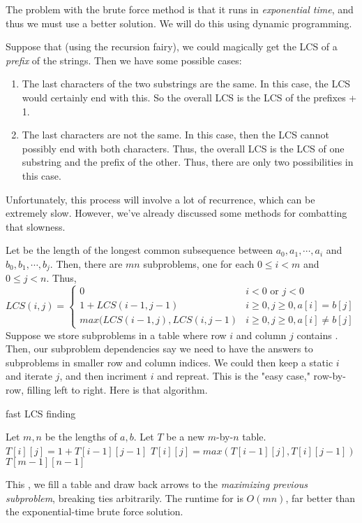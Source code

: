 \documentclass[titlepage, 12pt, leqno]{article}
\begin{document}
The problem with the brute force method is that it runs in \textit{exponential
time}, and thus we must use a better solution. We will do this using dynamic
programming. 

Suppose that (using the recursion fairy), we could magically get
the LCS of a \textit{prefix} of the strings. Then we have some possible cases:
\begin{enumerate}
    \item The last characters of the two substrings are the same. In this case,
        the LCS would certainly end with this. So the overall LCS is the LCS
        of the prefixes + 1.
    \item The last characters are not the same. In this case, then the LCS 
        cannot possibly end with both characters. Thus, the overall LCS is
        the LCS of one substring and the prefix of the other. Thus, there
        are only two possibilities in this case.
\end{enumerate}
Unfortunately, this process will involve a lot of recurrence, which can be
extremely slow. However, we've already discussed some methods for combatting
that slowness.

Let  be the length of the longest common subsequence between
$a_{0}, a_{1}, \cdots , a_{i}$ and $b_{0}, b_{1}, \cdots ,b_{j}$. Then, there
are $mn$ subproblems, one for each $0\le i < m$ and $0 \le j < n$. Thus,
\[
LCS(i,j) =
\begin{cases}
    0 & i < 0 \text{ or } j < 0 \\
    1 + LCS(i-1,j-1) & i \ge 0, j \ge 0, a[i] = b[j] \\
    max(LCS(i-1,j), LCS(i,j-1) & i \ge 0, j \ge 0, a[i] \ne b[j]
\end{cases}
\]
Suppose we store subproblems in a table where row $i$ and column $j$ contains
. Then, our subproblem dependencies say we need to have the 
answers to subproblems in smaller row and column indices. We could then keep a
static $i$ and iterate $j$, and then incriment $i$ and repreat. This is the "easy 
case," row-by-row, filling left to right. Here is that algorithm.

\begin{algorithm}
\caption{fast LCS finding}
\begin{algorithmic}[1]
    \State Let $m,n$ be the lengths of $a,b$.
    \State Let $T$ be a new $m$-by-$n$ table.
                \State $T[i][j] = 1 + T[i-1][j-1]$
            \Else
                \State $T[i][j] = max(T[i-1][j], T[i][j-1])$
            \EndIf
        \EndFor
    \EndFor
    \State \Return $T[m-1][n-1]$
\EndProcedure 
\end{algorithmic}
\end{algorithm}

This , we fill a table and draw back arrows to the 
\textit{maximizing previous subproblem}, breaking ties arbitrarily. The runtime
for  is $O(mn)$, far better than the exponential-time brute force
solution.
\end{document}
